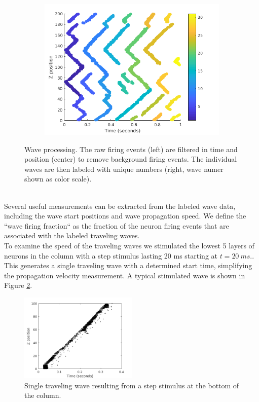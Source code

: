\documentclass[a4paper,11pt]{article}
\begin{document}
\begin{figure}[!htb]
\begin{subfigure}{0.33\textwidth}
 \end{subfigure}%
 \begin{subfigure}{0.33\textwidth}
  \centering
  \includegraphics[width=\textwidth]{fig/2x2_wave_IDs}
 \end{subfigure}%
 \caption{Wave processing. The raw firing events (left) are filtered in time and position (center) to remove background firing events. The individual waves are then labeled with unique numbers (right, wave numer shown as color scale).}
 \label{fig:wave_analysis}
\end{figure}
\\
Several useful measurements can be extracted from the labeled wave data, including the wave start positions and wave propagation speed.
We define the ``wave firing fraction`` as the fraction of the neuron firing events that are associated with the labeled traveling waves.
\\
To examine the speed of the traveling waves we stimulated the lowest 5 layers of neurons in the column with a step stimulus lasting 20 ms starting at $t=20~ms$..
This generates a single traveling wave with a determined start time, simplifying the propagation velocity measurement.
A typical stimulated wave is shown in Figure \ref{fig:wave_example}.
\begin{figure}[!htb]
 \caption{Single traveling wave resulting from a step stimulus at the bottom of the column.}
 \label{fig:wave_example}
 \centering
   \includegraphics[width=0.5\textwidth]{fig/TypicalWave}
\end{figure}
\end{document}
